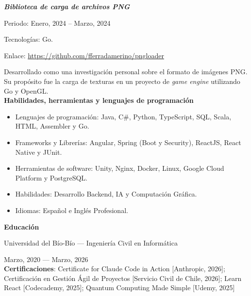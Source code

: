 \documentclass{article}
\begin{document}
	\textit{\textbf{Biblioteca de carga de archivos PNG}} \par
	Periodo: Enero, 2024 -- Marzo, 2024 \par
	Tecnologías: Go. \par
	Enlace: \url{https://github.com/fferradamerino/pngloader} \par
	Desarrollado como una investigación personal sobre el formato de imágenes PNG. Su propósito fue la carga de texturas en un proyecto de \textit{game engine} utilizando Go y OpenGL. \\
	
	\noindent
	\textbf{Habilidades, herramientas y lenguajes de programación}

	\begin{itemize}
		\item Lenguajes de programación: Java, C\#, Python, TypeScript, SQL, Scala, HTML, Assembler y Go.
		\item Frameworks y Librerías: Angular, Spring (Boot y Security), ReactJS, React Native y JUnit.
		\item Herramientas de software: Unity, Nginx, Docker, Linux, Google Cloud Platform y PostgreSQL.
		\item Habilidades: Desarrollo Backend, IA y Computación Gráfica.
		\item Idiomas: Español e Inglés Profesional.
	\end{itemize}
	
	\noindent
	\textbf{Educación}
	
	Universidad del Bío-Bío --- Ingeniería Civil en Informática \par
	Marzo, 2020 --- Marzo, 2026 \\
	
	\noindent
	\textbf{Certificaciones}: Certificate for Claude Code in Action [Anthropic, 2026]; Certificación en Gestión Ágil de Proyectos [Servicio Civil de Chile, 2026]; Learn React [Codecademy, 2025]; Quantum Computing Made Simple [Udemy, 2025]
	
\end{document}
